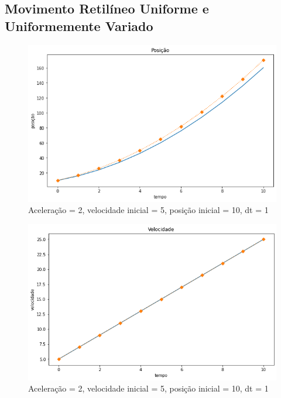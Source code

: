 \documentclass[12pt]{article}
\begin{document}
\subsection{Movimento Retilíneo Uniforme e Uniformemente Variado}
\begin{figure}[H]
  \centering
  \includegraphics[scale = 0.6]{imagens/dt=1 tf=10 posicao.png}
  \caption{Aceleração = 2, velocidade inicial = 5, posição inicial = 10, dt = 1}
\end{figure}
\begin{figure}[H]
  \centering
  \includegraphics[scale = 0.6]{imagens/dt=1 tf=10 velocidade.png}
  \caption{Aceleração = 2, velocidade inicial = 5, posição inicial = 10, dt = 1}
\end{figure}
\end{document}
